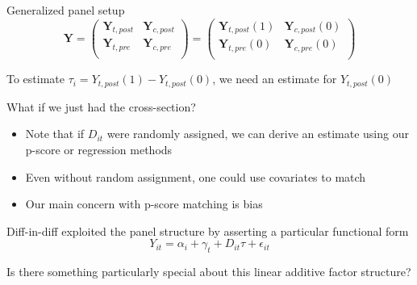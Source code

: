 \documentclass[notes,11pt, aspectratio=169]{beamer}
\newenvironment{wideitemize}{\itemize\addtolength{\itemsep}{10pt}}{\enditemize}
\begin{document}
\begin{frame}{Generalized panel setup}
      \begin{equation*}
        \mathbf{Y} = \left( \begin{array}{cc}
                              \mathbf{Y}_{t,post} & \mathbf{Y}_{c,post} \\
                              \mathbf{Y}_{t,pre} & \mathbf{Y}_{c,pre} \\
                            \end{array}
                            \right) =  \left( \begin{array}{cc}
                              \mathbf{Y}_{t,post}(1) & \mathbf{Y}_{c,post}(0) \\
                              \mathbf{Y}_{t,pre}(0) & \mathbf{Y}_{c,pre}(0) \\
                            \end{array}
                            \right) 
      \end{equation*}
      \begin{wideitemize}
      \item To estimate $\tau_{i} = Y_{t,post}(1) - Y_{t,post}(0)$, we
        need an estimate for $Y_{t,post}(0)$
      \item What if we just had the cross-section?
        \begin{itemize}
        \item Note that if $D_{it}$ were randomly assigned, we can
          derive an estimate using our p-score or regression methods
        \item Even without random assignment, one could use covariates
          to match
        \item Our main concern with p-score matching is bias
        \end{itemize}
      \item Diff-in-diff exploited the panel structure by asserting a particular functional form
        \begin{equation*}
          Y_{it} = \alpha_{i} + \gamma_{t} + D_{it}\tau + \epsilon_{it}
        \end{equation*}
      \item Is there something particularly special about this linear
        additive factor structure?
      \end{wideitemize}
\end{frame}
\end{document}
